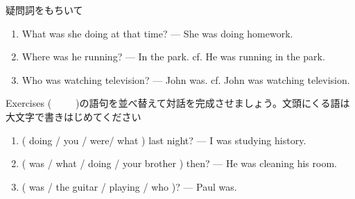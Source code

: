 \documentclass[aspectratio=169,xcolor={dvipsnames,table}]{beamer}
\begin{document}
\begin{frame}[plain]{疑問詞をもちいて}
 \begin{enumerate}
  \item What was she doing at that time? --- She was doing homework.
  \item Where was he running? --- In the park.
	\mbox{}\hfill{}cf. He was running in the park.
  \item Who was watching television? --- John was.
	\mbox{}\hfill{}cf. John was watching television.
 \end{enumerate}

\end{frame}
\begin{frame}[plain]{Exercises}
(~~~~~)の語句を並べ替えて対話を完成させましょう。文頭にくる語は大文字で書きはじめてください
\begin{enumerate}
 \item ( doing / you / were/ what ) last night?
--- I was studying history. \\
 \item ( was / what / doing / your brother ) then?
--- He was cleaning his room.\\
 \item ( was / the guitar / playing / who )? --- Paul was.\\
\end{enumerate}


\end{frame}
\end{document}
